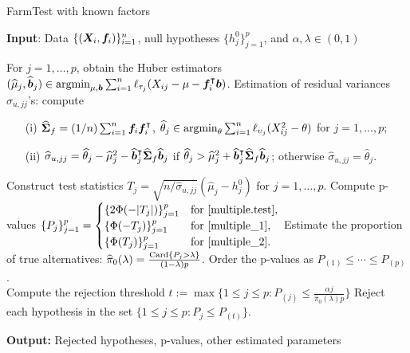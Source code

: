 \begin{algorithm}[!t]
\caption{FarmTest with known factors \citep{ZBFL2017}} \label{alg1}
\hspace*{\algorithmicindent}   \hspace{-0.5cm} \textbf{Input}: Data $\{ ( \bX_i , \bff_i ) \}_{i=1}^n$, null hypotheses $\{h^0_j\}_{j=1}^p$, and $\alpha, \lambda \in (0,1)$
\begin{algorithmic}[1]
\STATE For $j = 1, \ldots, p$, obtain the Huber estimators $ ( \hat{\mu}_j  , \hat{\bb}_j  )  \in  \argmin_{  \mu, \bb    } \sn \ell_{\tau_j}( X_{ij}    -    \mu -  \bff_i^\T \bb ) $.
\STATE Estimation of residual variances $\sigma_{u,jj}$'s: compute 
\begin{enumerate}
\item[(i)] $\hat{\bSigma}_f = (1/n) \sn \bff_i \bff_i^\intercal$, $\hat{\theta}_{j}  \in  \argmin_{ \theta } \sn \ell_{\upsilon_j   }( X^2_{ij}    -    \theta)$ for $j=1,\ldots,p$;
\item[(ii)] $\hat{\sigma}_{u, jj} =    \hat{\theta}_j-\hat{\mu}^2_j    -  \hat{\bb}_j^\intercal \hat{\bSigma}_f  \hat{\bb}_j$ if $\hat \theta_j  > \hat{\mu}^2_j    +  \hat{\bb}_j^\intercal \hat{\bSigma}_f  \hat{\bb}_j  $; otherwise $\hat{\sigma}_{u, jj} = \hat{\theta}_j $.
\end{enumerate}
\STATE Construct test statistics $T_j  =  \sqrt{n/ \hat{\sigma}_{u,jj}}  (\hat{\mu}_{j}-h^0_j )$ for $j=1,\ldots, p$.
\STATE Compute p-values $\{ P_j \}_{j=1}^p= \begin{cases}
 \{2\Phi(-|T_j|) \}_{j=1}^p & \text{for \eqref{multiple.test}}, \\
  \{\Phi(-T_j) \}_{j=1}^p& \text{for \eqref{multiple_1}}, \\
  \{\Phi(T_j) \}_{j=1}^p& \text{for \eqref{multiple_2}}.
  \end{cases}$
\STATE Estimate the proportion of true alternatives: $\hat \pi_0(\lambda)=\frac{{\rm Card} \{P_j > \lambda\}}{(1-\lambda)p}$.
\STATE  Order the p-values  as $P_{(1)}\leq \cdots \leq P_{(p)}$. \\ Compute the rejection threshold $t:=\max \{ 1 \leq j \leq p :  P_{(j)} \leq \frac{\alpha j}{\hat \pi_0(\lambda) p}\}$
\STATE Reject each hypothesis in the set $\{ 1\leq j \leq p :  P_j \leq P_{(t)}\}$.
\end{algorithmic}
 \hspace*{\algorithmicindent}  \hspace{-0.5cm}  \textbf{Output:} Rejected hypotheses, p-values, other estimated parameters
 \end{algorithm}


